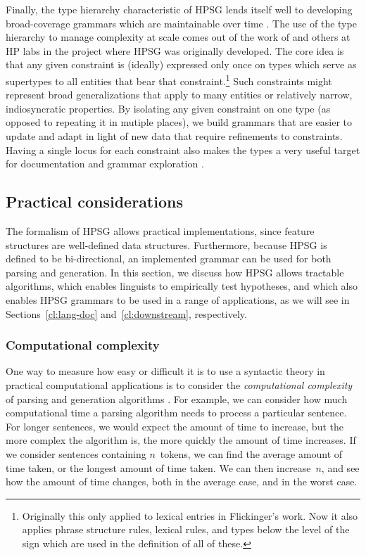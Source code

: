 \documentclass[output=paper,nonflat]{langsci/langscibook}
\begin{document}
Finally, the type hierarchy characteristic of HPSG lends itself well to developing broad-coverage grammars which are maintainable over time \citep{FIXME-find-cite?}. The use of the type hierarchy to manage complexity at scale comes out of the work of \citet{Flickinger87} and others at HP labs in the project where HPSG was originally developed. The core idea is that any given constraint is (ideally) expressed only once on types which serve as supertypes to all entities that bear that constraint.\footnote{Originally this only applied to lexical entries in Flickinger's work. Now it also applies phrase structure rules, lexical rules, and types below the level of the sign which are used in the definition of all of these.} Such constraints might represent broad generalizations that apply to many entities or relatively narrow, indiosyncratic properties. By isolating any given constraint on one type (as opposed to repeating it in mutiple places), we build grammars that are easier to update and adapt in light of new data that require refinements to constraints. Having a single locus for each constraint also makes the types a very useful target for documentation \citep{FIXME:LTDB} and grammar exploration \citep{FIXME:typediff}. 


\subsection{Practical considerations}
\label{cl:prac}

The formalism of HPSG allows practical implementations,
since feature structures are well-defined data structures.
Furthermore, because HPSG is defined to be bi-directional,
an implemented grammar can be used for both parsing and generation.
In this section, we discuss how HPSG allows tractable algorithms,
which enables linguists to empirically test hypotheses,
and which also enables HPSG grammars to be used in a range of applications,
as we will see in Sections~\ref{cl:lang-doc} and~\ref{cl:downstream}, respectively.

\subsubsection{Computational complexity}
\label{cl:prac:comp}

One way to measure how easy or difficult it is to use a syntactic theory in practical computational applications
is to consider the \textit{computational complexity} of parsing and generation algorithms \cite{FIXME-Hopcroft-and-Ullman?}.
For example, we can consider how much computational time
a parsing algorithm needs to process a particular sentence.
For longer sentences, we would expect the amount of time to increase,
but the more complex the algorithm is,
the more quickly the amount of time increases.
If we consider sentences containing $n$~tokens,
we can find the average amount of time taken,
or the longest amount of time taken.
We can then increase~$n$, and see how the amount of time changes,
both in the average case, and in the worst case.
\end{document}
